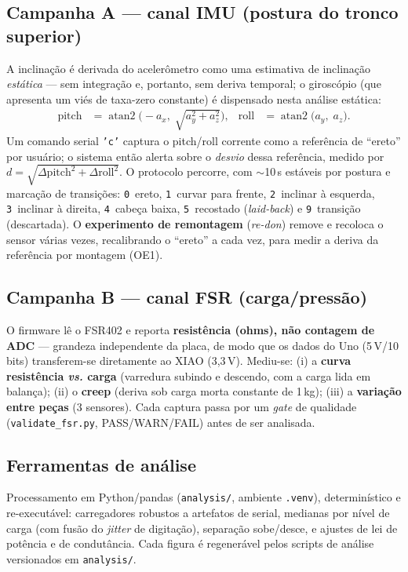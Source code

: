 \documentclass[12pt,a4paper]{article}
\begin{document}
\subsection{Campanha A --- canal IMU (postura do tronco superior)}
A inclinação é derivada do acelerômetro como uma estimativa de inclinação
\emph{estática} --- sem integração e, portanto, sem deriva temporal; o giroscópio
(que apresenta um viés de taxa-zero constante) é dispensado nesta análise estática:
\begin{align}
  \text{pitch} &= \operatorname{atan2}\!\big(-a_x,\; \sqrt{a_y^2 + a_z^2}\big), &
  \text{roll}  &= \operatorname{atan2}\!\big(a_y,\; a_z\big).
\end{align}
Um comando serial \texttt{'c'} captura o pitch/roll corrente como a referência de
``ereto'' por usuário; o sistema então alerta sobre o \emph{desvio} dessa referência,
medido por $d = \sqrt{\Delta\text{pitch}^2 + \Delta\text{roll}^2}$. O protocolo
percorre, com $\sim$10\,s estáveis por postura e marcação de transições:
\texttt{0}~ereto, \texttt{1}~curvar para frente, \texttt{2}~inclinar à esquerda,
\texttt{3}~inclinar à direita, \texttt{4}~cabeça baixa, \texttt{5}~recostado
(\emph{laid-back}) e \texttt{9}~transição (descartada). O \textbf{experimento de
remontagem} (\emph{re-don}) remove e recoloca o sensor várias vezes, recalibrando o
``ereto'' a cada vez, para medir a deriva da referência por montagem (OE1).

\subsection{Campanha B --- canal FSR (carga/pressão)}
O firmware lê o FSR402 e reporta \textbf{resistência (ohms), não contagem de ADC} ---
grandeza independente da placa, de modo que os dados do Uno (5\,V/10\,bits)
transferem-se diretamente ao XIAO (3{,}3\,V). Mediu-se: (i) a \textbf{curva
resistência {\itshape vs.} carga} (varredura subindo e descendo, com a carga lida em
balança); (ii) o \textbf{creep} (deriva sob carga morta constante de 1\,kg);
(iii) a \textbf{variação entre peças} (3 sensores). Cada captura passa por um
\emph{gate} de qualidade (\texttt{validate\_fsr.py}, PASS/WARN/FAIL) antes de ser
analisada.

\subsection{Ferramentas de análise}
Processamento em Python/pandas (\texttt{analysis/}, ambiente \texttt{.venv}),
determinístico e re-executável: carregadores robustos a artefatos de serial,
medianas por nível de carga (com fusão do \emph{jitter} de digitação), separação
sobe/desce, e ajustes de lei de potência e de condutância. Cada figura é
regenerável pelos scripts de análise versionados em \texttt{analysis/}.
\end{document}
